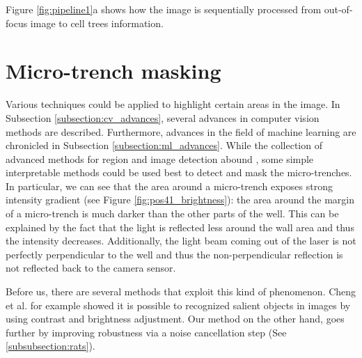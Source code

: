 \documentclass[pdftex,12pt,a4paper]{report}
\begin{document}
Figure \ref{fig:pipeline1}a shows how the image is sequentially processed from out-of-focus image to cell trees information.

\section{Micro-trench masking}
\label{subsection:micro_trench_masking}

Various techniques could be applied to highlight certain areas in the image. In Subsection \ref{subsection:cv_advances}, several advances in computer vision methods are described. Furthermore, advances in the field of machine learning are chronicled in Subsection \ref{subsection:ml_advances}. While the collection of advanced methods for region and image detection abound \cite{krahenbuhl2011efficient, long2015fully, ronneberger2015u}, some simple interpretable methods could be used best to detect and mask the micro-trenches. In particular,  we can see that the area around a micro-trench exposes strong intensity gradient (see Figure \ref{fig:pos41_brightness}): the area around the margin of a micro-trench is much darker than the other parts of the well. This can be explained by the fact that the light is reflected less around the wall area and thus the intensity decreases. Additionally, the light beam coming out of the laser is not perfectly perpendicular to the well and thus the non-perpendicular reflection is not reflected back to the camera sensor.

Before us, there are several methods that exploit this kind of phenomenon. Cheng et al. \cite{cheng2015global} for example showed it is possible to recognized salient objects in images by using contrast and brightness adjustment. Our method on the other hand, goes further by improving robustness via a noise cancellation step (See \ref{subsubsection:rats}).
\end{document}
